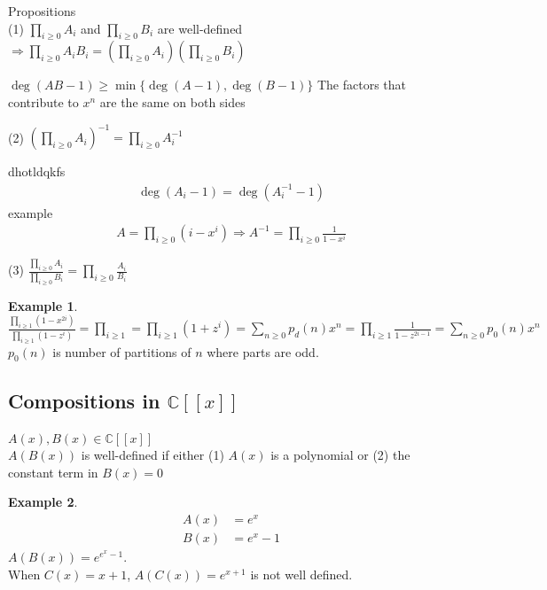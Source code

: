 \documentclass{article}
\theoremstyle{definition}
\newtheorem{ex}{Example}[]
\newenvironment{pf*}{\pushQED{\qed}\pf}{\popQED\endpf}
\begin{document}
Propositions \\ 
(1) $\prod_{i\ge 0} A_i$ and $\prod_{i\ge 0 } B_i$ are well-defined $\Rightarrow \prod_{i\ge 0} A_i B_i = \left(\prod_{i\ge 0} A_i\right)\left(\prod_{i\ge 0} B_i\right)$
\begin{pf*}
    $\deg(AB - 1) \ge \min \{ \deg(A-1), \deg(B-1)\}$
    The factors that contribute to $x^n$ are the same on both sides
\end{pf*} 
(2) $\left( \prod_{i\ge 0} A_i  \right)^{-1} = \prod_{i\ge 0} A_i^{-1}$
\begin{pf*}
     dhotldqkfs
    \begin{align*}
        \deg(A_i - 1) = \deg(A_i^{-1} - 1)
    \end{align*}
    example \\ 
    \begin{align*}
        A = \prod_{i\ge 0} (i - x^{i}) \Rightarrow A^{-1} = \prod_{i\ge 0} \frac{1}{1-x^i}
    \end{align*}
\end{pf*}
(3) $ \frac{\prod_{i\ge 0 } A_i}{\prod_{i \ge 0} B_i} = \prod_{i\ge 0} \frac{A_i}{B_i}$
\begin{ex}
    $\frac{\prod_{i\ge 1}(1-x^{2i})}{\prod_{i\ge 1} (1-z^i)} = \prod_{i \ge 1} = \prod_{i\ge 1} (1+ z^i) = \sum_{n\ge 0} p_d(n) x^n
    = \prod_{i\ge 1} \frac{1}{1-z^{2i-1}} = \sum_{n\ge 0} p_0(n)x^n$ \\ 
    $p_0(n)$ is number of partitions of $n$ where parts are odd.
\end{ex}
\subsection{Compositions in $\mathbb{C}[[x]]$}
$A(x), B(x) \in \mathbb{C}[[x]]$ \\ 
$A(B(x))$ is well-defined if either (1) $A(x)$ is a polynomial or 
(2) the constant term in $B(x) = 0$
\begin{ex}
    \begin{align*}
        A(x) &= e^x \\ 
        B(x) &= e^x - 1
    \end{align*}
    $A(B(x)) = e^{e^{x} - 1}$. \\ 
    When $C(x) = x+1$, $A(C(x)) = e^{x+1}$ is not well defined.
\end{ex}
\end{document}

